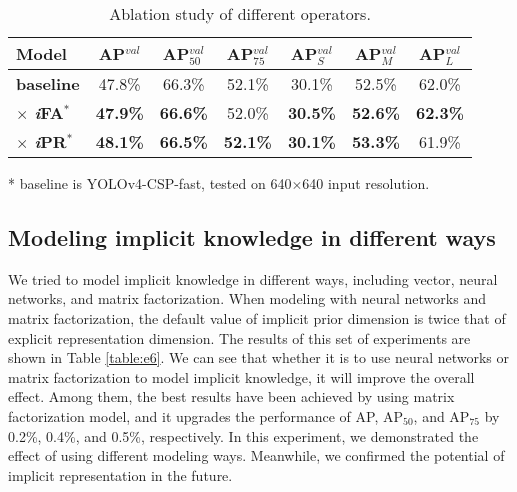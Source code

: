 \documentclass[10pt,twocolumn,letterpaper]{article}
\begin{document}
\begin{table}[h]
	\vspace{-2mm}
	\centering
	\begin{threeparttable}[h]
		\footnotesize
		\caption{Ablation study of different operators.}
		\label{table:e5}
		\setlength\tabcolsep{4.5pt}
		\begin{tabular}{lcccccc}
			\toprule
			\textbf{Model} & \textbf{AP$^{val}$} & \textbf{AP$^{val}_{50}$} & \textbf{AP$^{val}_{75}$} & \textbf{AP$^{val}_{S}$} & \textbf{AP$^{val}_{M}$} & \textbf{AP$^{val}_{L}$} \\				
			\midrule
			\textbf{baseline} & 47.8\% & 66.3\% & 52.1\% & 30.1\% & 52.5\% & 62.0\% \\				
			\midrule
			\textbf{$\times$ \textit{i}FA$^{*}$} & \textbf{47.9\%} & \textbf{66.6\%} & 52.0\% & \textbf{30.5\%} & \textbf{52.6\%} & \textbf{62.3\%} \\
			\textbf{$\times$ \textit{i}PR$^{*}$} & \textbf{48.1\%} & \textbf{66.5\%} & \textbf{52.1\%} & \textbf{30.1\%} & \textbf{53.3\%} & 61.9\% \\
			\bottomrule
		\end{tabular}
		\begin{tablenotes}[flushleft]
			\footnotesize
			\item[*] baseline is YOLOv4-CSP-fast, tested on 640$\times$640 input resolution.
		\end{tablenotes}
	\end{threeparttable}
    \vspace{-2mm}
\end{table}

\newpage

\subsection{Modeling implicit knowledge in different ways}
\label{sec:ima}

We tried to model implicit knowledge in different ways, including vector, neural networks, and matrix factorization. When modeling with neural networks and matrix factorization, the default value of implicit prior dimension is twice that of explicit representation dimension. The results of this set of experiments are shown in Table \ref{table:e6}. We can see that whether it is to use neural networks or matrix factorization to model implicit knowledge, it will improve the overall effect. Among them, the best results have been achieved by using matrix factorization model, and it upgrades the performance of AP, AP$_{50}$, and AP$_{75}$ by 0.2\%, 0.4\%, and 0.5\%, respectively. In this experiment, we demonstrated the effect of using different modeling ways. Meanwhile, we confirmed the potential of implicit representation in the future.
\end{document}
